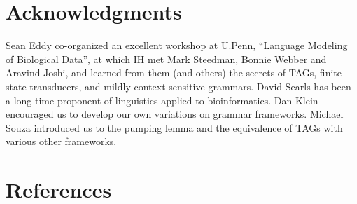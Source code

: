 \documentclass[10pt]{article}
\begin{document}
\newpage
\section{Acknowledgments}

Sean Eddy co-organized an excellent workshop at U.Penn, ``Language Modeling of Biological Data'',
at which IH met Mark Steedman, Bonnie Webber and Aravind Joshi,
and learned from them (and others) the secrets of TAGs, finite-state transducers, and mildly context-sensitive grammars.
David Searls has been a long-time proponent of linguistics applied to bioinformatics.
Dan Klein encouraged us to develop our own variations on grammar frameworks.
Michael Souza introduced us to the pumping lemma and the equivalence of TAGs with various other frameworks.

\section{References}


\end{document}
